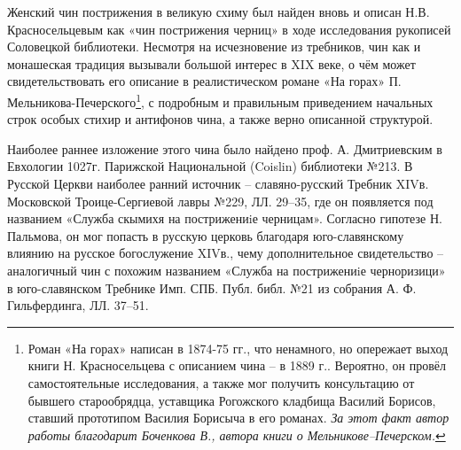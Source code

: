 Женский чин пострижения в великую схиму был найден вновь и описан Н.В. Красносельцевым как «чин пострижения черниц»\cite[С.~134–169]{@krasnoseltcev.uprazdnenniye.1889} в ходе исследования рукописей Соловецкой библиотеки.
Несмотря на исчезновение из требников, чин как и монашеская традиция вызывали большой интерес в XIX веке, о чём может свидетельствовать его описание в реалистическом романе «На горах» П. Мельникова-Печерского\footnote{Роман «На горах» написан в 1874-75 гг., что ненамного, но опережает выход книги Н. Красносельцева с описанием чина -- в 1889 г.. Вероятно, он провёл самостоятельные исследования, а также мог получить консультацию от бывшего старообрядца, уставщика Рогожского кладбища Василий Борисов, ставший прототипом Василия Борисыча в его романах. \textit{За этот факт автор работы благодарит Боченкова В., автора книги о Мельникове–Печерском.}}, с подробным и правильным приведением начальных строк особых стихир и антифонов чина, а также верно описанной структурой.

Наиболее раннее изложение этого чина было найдено проф. А. Дмитриевским в Евхологии 1027г. Парижской Национальной (Coislin) библиотеки №213\cite[С.~1035–1042]{dmitriyevskiy.opisaniye.1901}.
В Русской Церкви наиболее ранний источник -- славяно-русский Требник XIVв. Московской Троице-Сергиевой лавры №229, ЛЛ. 29--35, где он появляется под названием «Служба скымихя на пострижениiе черницам».
Согласно гипотезе Н. Пальмова, он мог попасть в русскую церковь благодаря юго-славянскому влиянию на русское богослужение XIVв.\cite[С.~14]{palmov.postrijeniye.1914}, чему дополнительное свидетельство -- аналогичный чин с похожим названием «Служба на пострижениiе черноризици» в юго-славянском Требнике Имп. СПБ. Публ. библ. №21 из собрания А. Ф. Гильфердинга, ЛЛ. 37--51.


